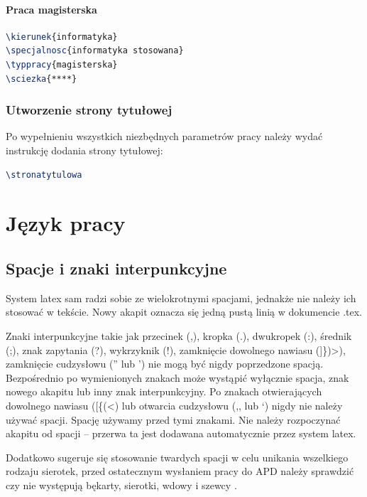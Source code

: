 \documentclass{wfiisul}
\begin{document}
\subsubsection{Praca magisterska}
\begin{lstlisting}[language=TeX, basicstyle=\ttfamily]
\kierunek{informatyka}
\specjalnosc{informatyka stosowana}
\typpracy{magisterska}
\sciezka{****}
\end{lstlisting}

\subsection{Utworzenie strony tytułowej}

Po wypełnieniu wszystkich niezbędnych parametrów pracy należy wydać instrukcję  dodania strony tytułowej:

\begin{lstlisting}[language=TeX, basicstyle=\ttfamily, inputencoding=utf8, extendedchars=false]
\stronatytulowa
\end{lstlisting}


\chapter{Język pracy}

\section{Spacje i znaki interpunkcyjne}
System latex sam radzi sobie ze wielokrotnymi spacjami, jednakże nie należy ich stosować w tekście. Nowy akapit oznacza się jedną pustą linią w dokumencie .tex.

Znaki interpunkcyjne takie jak przecinek (,), kropka (.), dwukropek (:), średnik (;), znak zapytania (?), wykrzyknik (!), zamknięcie dowolnego nawiasu (]\})>), zamknięcie cudzysłowu ('' lub ') nie mogą być nigdy poprzedzone spacją. Bezpośrednio po wymienionych znakach może wystąpić wyłącznie spacja, znak nowego akapitu lub inny znak interpunkcyjny. Po znakach otwierających dowolnego nawiasu ([\{(<) lub otwarcia cudzysłowu (,, lub `) nigdy nie należy używać spacji. Spację używamy przed tymi znakami. Nie należy rozpoczynać akapitu od spacji – przerwa ta jest dodawana  automatycznie przez system latex.

Dodatkowo sugeruje się stosowanie twardych spacji w celu unikania wszelkiego rodzaju sierotek, przed ostatecznym wysłaniem pracy do APD należy sprawdzić czy nie występują  bękarty, sierotki, wdowy i szewcy \cite{Bekart}.
\end{document}
